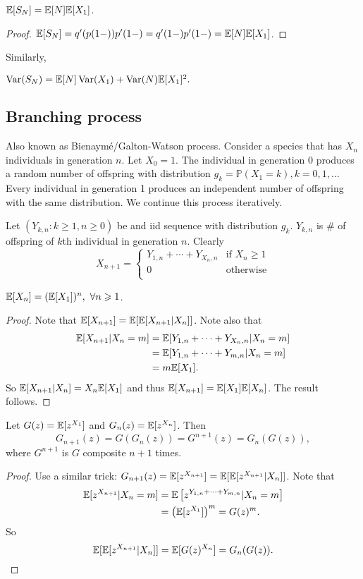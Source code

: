 \begin{corollary}
    $ {\mathbb{E}}[S_N] ={\mathbb{E}}[N]{\mathbb{E}}[X_1] $.
\end{corollary}
\begin{proof}
    $ {\mathbb{E}}[S_N]= q'(p(1-)) p'(1-)=q'(1-)p'(1-)={\mathbb{E}}[N]{\mathbb{E}}[X_1]$.
\end{proof}
Similarly,
\begin{corollary}
    $ \operatorname{Var}(S_N)={\mathbb{E}}[N]\operatorname{Var}(X_1)+\operatorname{Var}(N){\mathbb{E}}[X_1]^2 . $
\end{corollary}

\subsection{Branching process}
Also known as Bienaym\'{e}/Galton-Watson process. Consider a species that has $X_n$ individuals in generation $n$. Let $ X_0=1 $. The individual in generation 0 produces a random number of offspring with distribution $ g_k = \mathbb{P}(X_1=k),k=0,1,\dots $ Every individual in generation 1 produces an independent number of offspring with the same distribution. We continue this process iteratively.

Let $ (Y_{k,n}: k\ge 1,n\ge 0) $ be and iid sequence with distribution $ g_k $. $Y_{k,n}$ is \# of offspring of $k$th individual in generation $n$. Clearly 
\[
    X_{n+1} = \begin{cases}
    Y_{1,n}+\cdots+Y_{X_n,n} &\text{if } X_n\ge 1\\
    0 &\text{otherwise}\\
    \end{cases} 
\]

\begin{theorem}
    $ {\mathbb{E}}[X_n] = ({\mathbb{E}}[X_1])^n,\ \forall n\geqslant 1 $.
\end{theorem}
\begin{proof}
    Note that $ {\mathbb{E}}[X_{n+1}]={\mathbb{E}}[{\mathbb{E}}[X_{n+1}|X_n]] $. Note also that 
    \begin{align*}
        {\mathbb{E}}[X_{n+1}|X_n=m] &= {\mathbb{E}}[Y_{1,n}+\cdots +Y_{X_n,n}|X_n=m]\\ 
        &= {\mathbb{E}}[Y_{1,n}+\cdots +Y_{m,n}|X_n=m]\\ 
        &= m{\mathbb{E}}[X_1].
    \end{align*}
    So $ {\mathbb{E}}[X_{n+1}|X_n] = X_n{\mathbb{E}}[X_1] $ and thus $ {\mathbb{E}}[X_{n+1}]={\mathbb{E}}[X_1]{\mathbb{E}}[X_n] $. The result follows.
\end{proof}
\begin{theorem}
    Let $ G(z) = {\mathbb{E}}[z^{X_1}] $ and $ G_n(z)={\mathbb{E}}[z^{X_n}] $. Then 
    \[
        G_{n+1}(z) = G(G_n(z)) = G^{n+1}(z)=G_n(G(z)),
    \]
    where $G^{n+1}$ is $G$ composite $n+1$ times.
\end{theorem}
\begin{proof}
    Use a similar trick: $ G_{n+1}(z) = {\mathbb{E}}[z^{X_{n+1}}]={\mathbb{E}}[{\mathbb{E}}[z^{X_{n+1}}|X_n]] $. Note that 
    \begin{align*}
        {\mathbb{E}}[z^{X_{n+1}}|X_n=m] &= {\mathbb{E}}\left[ z^{Y_{1,n}+\cdots+Y_{m,n}}|X_n=m \right]\\ 
        &= \left( {\mathbb{E}}[z^{X_1}] \right)^m = G(z)^m.
    \end{align*}
    So 
    \[
        {\mathbb{E}}[{\mathbb{E}}[z^{X_{n+1}}|X_n]] = {\mathbb{E}}[G(z)^{X_n}] = G_n(G(z)).\qedhere
    \]
\end{proof}


